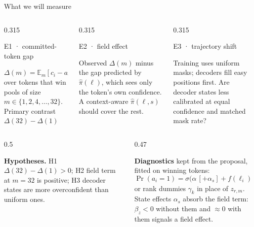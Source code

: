 \documentclass[aspectratio=169,10pt,t]{beamer}
\newcommand{\lbl}[1]{{\color{accentdark}\firasemibold #1}}
\newcommand{\paneltitle}[1]{{\color{accentdark}\small\firasemibold #1}\par\vspace{0.8mm}}
\begin{document}
\begin{frame}{What we will measure}
  \begin{columns}[T,onlytextwidth]
    \begin{column}{0.315\textwidth}
      \begin{panel}[height=25mm]
        \paneltitle{E1 · committed-token gap}
        $\Delta(m) = \mathbb{E}_m[c_i - a_i]$ over tokens that win pools of size
        $m \in \{1, 2, 4, \dots, 32\}$. Primary contrast $\Delta(32) - \Delta(1)$
      \end{panel}
    \end{column}
    \begin{column}{0.315\textwidth}
      \begin{panel}[height=25mm]
        \paneltitle{E2 · field effect}
        Observed $\Delta(m)$ minus the gap predicted by $\hat\pi(\ell)$, which sees only the
        token's own confidence. A context-aware $\hat\pi(\ell, s)$ should cover the rest.
      \end{panel}
    \end{column}
    \begin{column}{0.315\textwidth}
      \begin{panel}[height=25mm]
        \paneltitle{E3 · trajectory shift}
        Training uses uniform masks; decoders fill easy positions first. Are decoder states
        less calibrated at equal confidence and matched mask rate?
      \end{panel}
    \end{column}
  \end{columns}
  \vspace{2.5mm}
  \begin{columns}[T,onlytextwidth]
    \begin{column}{0.5\textwidth}
      \small\raggedright
      \textbf{Hypotheses.} \lbl{H1} $\Delta(32) - \Delta(1) > 0$;
      \lbl{H2} field term at $m = 32$ is positive;
      \lbl{H3} decoder states are more overconfident than uniform ones.\par\vspace{1.5mm}
    \end{column}
    \begin{column}{0.47\textwidth}
      \small\raggedright
      \textbf{Diagnostics} kept from the proposal, fitted on winning tokens:
      \[
        \Pr(a_i{=}1) = \sigma\big(\alpha\,[+\alpha_s] + f(\ell_i) + \beta_z z_{r,m}\big),
      \]
      or rank dummies $\gamma_k$ in place of $z_{r,m}$. State effects $\alpha_s$ absorb the
      field term: $\beta_z < 0$ without them and $\approx 0$ with them signals a field effect.
    \end{column}
  \end{columns}
\end{frame}
\end{document}
